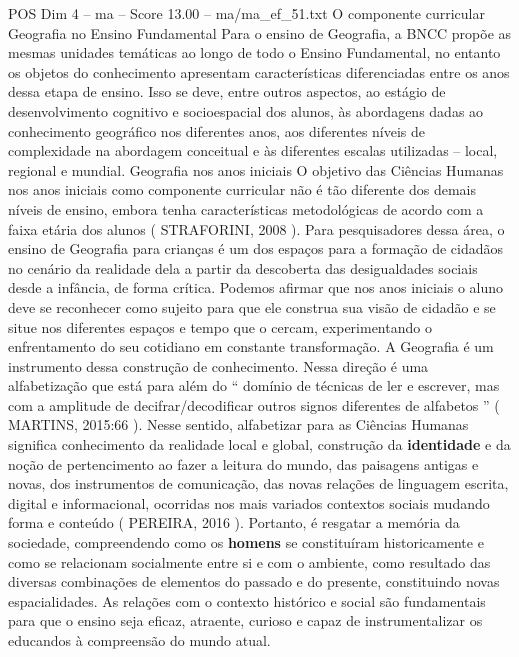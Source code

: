 \begin{textsample}{POS Dim 4 – ma – Score 13.00 – ma/ma\_ef\_51.txt}  \label{ex:f4_pos_056}
O componente curricular Geografia no Ensino Fundamental Para o ensino de Geografia, a BNCC propõe as mesmas unidades temáticas ao longo de todo o Ensino Fundamental, no entanto os objetos do conhecimento apresentam características diferenciadas entre os anos dessa etapa de ensino.
Isso se deve, entre outros aspectos, ao estágio de desenvolvimento cognitivo e socioespacial dos alunos, às abordagens dadas ao conhecimento geográfico nos diferentes anos, aos diferentes níveis de complexidade na abordagem conceitual e às diferentes escalas utilizadas – local, regional e mundial.
Geografia nos anos iniciais O objetivo das Ciências Humanas nos anos iniciais como componente curricular não é tão diferente dos demais níveis de ensino, embora tenha características metodológicas de acordo com a faixa etária dos alunos ( STRAFORINI, 2008 ).
Para pesquisadores dessa área, o ensino de Geografia para crianças é um dos espaços para a formação de cidadãos no cenário da realidade dela a partir da descoberta das desigualdades sociais desde a infância, de forma crítica.
Podemos afirmar que nos anos iniciais o aluno deve se reconhecer como sujeito para que ele construa sua visão de cidadão e se situe nos diferentes espaços e tempo que o cercam, experimentando o enfrentamento do seu cotidiano em constante transformação.
A Geografia é um instrumento dessa construção de conhecimento.
Nessa direção é uma alfabetização que está para além do “ domínio de técnicas de ler e escrever, mas com a amplitude de decifrar/decodificar outros signos diferentes de alfabetos ” ( MARTINS, 2015:66 ).
Nesse sentido, alfabetizar para as Ciências Humanas significa conhecimento da realidade local e global, construção da \textbf{identidade} e da noção de pertencimento ao fazer a leitura do mundo, das paisagens antigas e novas, dos instrumentos de comunicação, das novas relações de linguagem escrita, digital e informacional, ocorridas nos mais variados contextos sociais mudando forma e conteúdo ( PEREIRA, 2016 ).
Portanto, é resgatar a memória da sociedade, compreendendo como os \textbf{homens} se constituíram historicamente e como se relacionam socialmente entre si e com o ambiente, como resultado das diversas combinações de elementos do passado e do presente, constituindo novas espacialidades.
As relações com o contexto histórico e social são fundamentais para que o ensino seja eficaz, atraente, curioso e capaz de instrumentalizar os educandos à compreensão do mundo atual.

\end{textsample}
